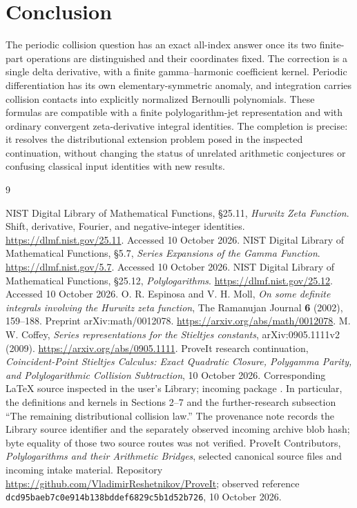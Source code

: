 \documentclass[11pt,a4paper]{article}
\numberwithin{equation}{section}
\theoremstyle{definition}
\begin{document}
\section*{Conclusion}
The periodic collision question has an exact all-index answer once its two finite-part operations are distinguished and their coordinates fixed. The correction is a single delta derivative, with a finite gamma--harmonic coefficient kernel. Periodic differentiation has its own elementary-symmetric anomaly, and integration carries collision contacts into explicitly normalized Bernoulli polynomials. These formulas are compatible with a finite polylogarithm-jet representation and with ordinary convergent zeta-derivative integral identities. The completion is precise: it resolves the distributional extension problem posed in the inspected continuation, without changing the status of unrelated arithmetic conjectures or confusing classical input identities with new results.

\begin{thebibliography}{9}
\raggedright
{}
NIST Digital Library of Mathematical Functions, \S25.11, \emph{Hurwitz Zeta Function}. Shift, derivative, Fourier, and negative-integer identities. \url{https://dlmf.nist.gov/25.11}. Accessed 10 October 2026.
NIST Digital Library of Mathematical Functions, \S5.7, \emph{Series Expansions of the Gamma Function}. \url{https://dlmf.nist.gov/5.7}. Accessed 10 October 2026.
NIST Digital Library of Mathematical Functions, \S25.12, \emph{Polylogarithms}. \url{https://dlmf.nist.gov/25.12}. Accessed 10 October 2026.
O. R. Espinosa and V. H. Moll, \emph{On some definite integrals involving the Hurwitz zeta function}, The Ramanujan Journal \textbf{6} (2002), 159--188. Preprint arXiv:math/0012078. \url{https://arxiv.org/abs/math/0012078}.
M. W. Coffey, \emph{Series representations for the Stieltjes constants}, arXiv:0905.1111v2 (2009). \url{https://arxiv.org/abs/0905.1111}.
ProveIt research continuation, \emph{Coincident-Point Stieltjes Calculus: Exact Quadratic Closure, Polygamma Parity, and Polylogarithmic Collision Subtraction}, 10 October 2026. Corresponding \LaTeX{} source inspected in the user's Library; incoming package . In particular, the definitions and kernels in Sections 2--7 and the further-research subsection ``The remaining distributional collision law.'' The provenance note records the Library source identifier and the separately observed incoming archive blob hash; byte equality of those two source routes was not verified.
ProveIt Contributors, \emph{Polylogarithms and their Arithmetic Bridges}, selected canonical source files and incoming intake material. Repository \url{https://github.com/VladimirReshetnikov/ProveIt}; observed reference \texttt{dcd95baeb7c0e914b138bddef6829c5b1d52b726}, 10 October 2026.
\end{thebibliography}
\end{document}
